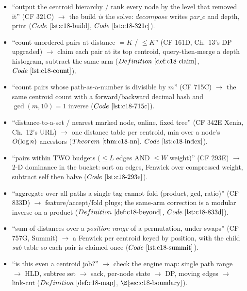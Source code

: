 \begin{itemize}[nosep, leftmargin=1.4em]
  \item ``output the centroid hierarchy / rank every node by the level that removed it'' (CF 321C)
        \(\to\) the build \emph{is} the solve: \(\mathit{decompose}\) writes \(\mathit{par\_c}\) and
        depth, print  (\(\coderef{c18-build}\), \(\coderef{c18-321c}\)).
  \item ``count unordered pairs at distance \(=K\) / \(\le K\)'' (CF 161D, Ch.~13's DP upgraded) \(\to\)
        claim each pair at its top centroid, query-then-merge a depth histogram, subtract the same
        arm (\(\defref{c18-claim}\), \(\coderef{c18-count}\)).
  \item ``count pairs whose path-as-a-number is divisible by \(m\)'' (CF 715C) \(\to\) the same
        centroid count with a forward/backward decimal hash and \(\gcd(m,10)=1\) inverse
        (\(\coderef{c18-715c}\)).
  \item ``distance-to-a-set / nearest marked node, online, fixed tree'' (CF 342E Xenia, Ch.~12's URL)
        \(\to\) one distance table per centroid, min over a node's \(O(\log n)\) ancestors
        (\(\thmref{c18-nn}\), \(\coderef{c18-index}\)).
  \item ``pairs within TWO budgets (\(\le L\) edges AND \(\le W\) weight)'' (CF 293E) \(\to\) 2-D
        dominance in the bucket: sort on edges, Fenwick over compressed weight, subtract self then
        halve (\(\coderef{c18-293e}\)).
  \item ``aggregate over all paths a single tag cannot fold (product, gcd, ratio)'' (CF 833D) \(\to\)
        feature/accept/fold plugs; the same-arm correction is a modular inverse on a product
        (\(\defref{c18-beyond}\), \(\coderef{c18-833d}\)).
  \item ``sum of distances over a \emph{position range} of a permutation, under swaps'' (CF 757G,
        Summit) \(\to\) a Fenwick per centroid keyed by position, with the child \emph{sub}
        table so each pair is claimed once (\(\coderef{c18-summit}\)).
  \item ``is this even a centroid job?'' \(\to\) check the engine map: single path range \(\to\) HLD,
        subtree set \(\to\) sack, per-node state \(\to\) DP, moving edges \(\to\) link-cut
        (\(\defref{c18-map}\), \(\secref{c18-boundary}\)).
\end{itemize}


